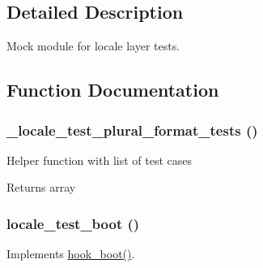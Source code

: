 \subsection{Detailed Description}
Mock module for locale layer tests. 

\subsection{Function Documentation}
\hypertarget{locale__test_8module_a42dcbf9a5e8e2f16e2aa0c908b2b5130}{
\subsubsection[{\_\-locale\_\-test\_\-plural\_\-format\_\-tests}]{\setlength{\rightskip}{0pt plus 5cm}\_\-locale\_\-test\_\-plural\_\-format\_\-tests ()}}
\label{locale__test_8module_a42dcbf9a5e8e2f16e2aa0c908b2b5130}
Helper function with list of test cases

\begin{DoxyReturn}{Returns}
array 
\end{DoxyReturn}
\hypertarget{locale__test_8module_a4b5cc29009b03154bef82702514343f8}{
\subsubsection[{locale\_\-test\_\-boot}]{\setlength{\rightskip}{0pt plus 5cm}locale\_\-test\_\-boot ()}}
\label{locale__test_8module_a4b5cc29009b03154bef82702514343f8}
Implements \hyperlink{group__hooks_ga9ac1dfffdc69471a3d00d67503c71577}{hook\_\-boot()}.

